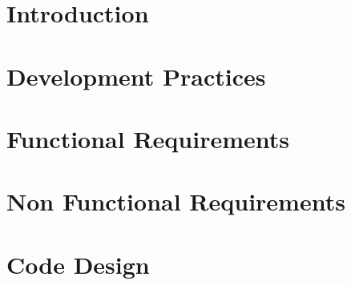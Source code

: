 



\chapter{Introduction}








\chapter{Development Practices}







\chapter{Functional Requirements}








\newpage



\chapter{Non Functional Requirements}




\chapter{Code Design}






